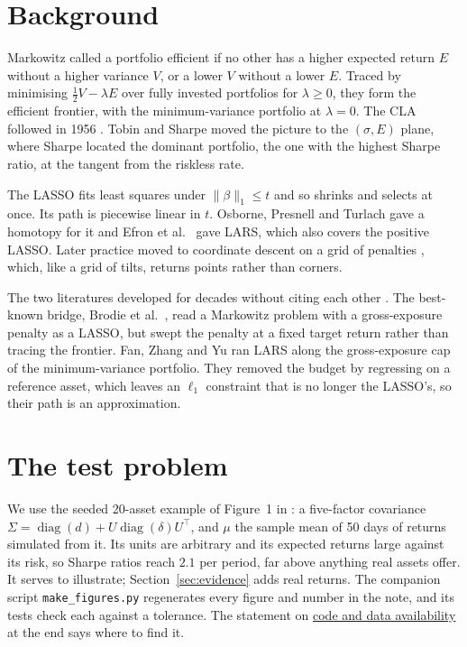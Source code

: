 \documentclass[11pt]{article}
\newcommand{\trans}{^{\top}}
\newcommand{\Sig}{\Sigma}
\begin{document}
\section{Background}
\label{sec:history}

Markowitz \cite{markowitz1952} called a portfolio efficient if no other has a higher
expected return $E$ without a higher variance $V$, or a lower $V$ without a lower $E$. Traced by minimising
$\tfrac12V-\lambda E$ over fully invested portfolios for $\lambda\ge0$, they form the
efficient frontier, with the minimum-variance portfolio at $\lambda=0$. The CLA followed
in 1956 \cite{markowitz1956}. Tobin \cite{tobin1958} and Sharpe \cite{sharpe1964} moved
the picture to the $(\sigma,E)$ plane, where Sharpe located the dominant portfolio, the
one with the highest Sharpe ratio, at the tangent from the riskless rate.

The LASSO fits least squares under $\|\beta\|_1\le t$ and so shrinks and selects at once.
Its path is piecewise linear in $t$. Osborne, Presnell and Turlach \cite{osborne2000}
gave a homotopy for it and Efron et al.\ \cite{efron2004} gave LARS, which also covers
the positive LASSO. Later practice moved to coordinate descent on a grid of penalties
\cite{friedman2010}, which, like a grid of tilts, returns points rather than corners.

The two literatures developed for decades without citing each other
\cite[\S5]{perspective}. The best-known
bridge, Brodie et al.\ \cite{brodie2009}, read a Markowitz problem with a gross-exposure
penalty as a LASSO, but swept the penalty at a fixed target return rather than tracing
the frontier. Fan, Zhang and Yu \cite{fan2012} ran LARS along the gross-exposure cap of
the minimum-variance portfolio. They removed the budget by regressing on a reference
asset, which leaves an $\ell_1$ constraint that is no longer the LASSO's, so their path
is an approximation.

\section{The test problem}
\label{sec:test}

We use the seeded 20-asset example of Figure~1 in \cite{perspective}: a five-factor
covariance $\Sig=\operatorname{diag}(d)+U\operatorname{diag}(\delta)U\trans$, and $\mu$
the sample mean of 50 days of returns simulated from it. Its units are arbitrary and
its expected returns large against its risk, so Sharpe ratios reach $2.1$ per period, far
above anything real assets offer. It serves to illustrate; Section~\ref{sec:evidence}
adds real returns. The companion script
\texttt{make\_figures.py} regenerates every figure and number in the note, and its tests
check each against a tolerance. The statement on
\hyperref[sec:availability]{code and data availability} at the end says where to find it.
\end{document}
